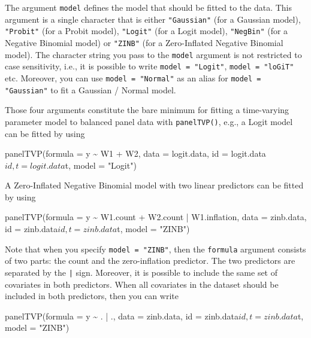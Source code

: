 \documentclass[a4paper, preprint, 3p,
authoryear]{elsarticle} %
\newenvironment{Shaded}{\begin{snugshade}}{\end{snugshade}}
\newcommand{\NormalTok}[1]{#1}
\begin{document}
The argument \texttt{model} defines the model that should be fitted to
the data. This argument is a single character that is either
\texttt{"Gaussian"} (for a Gaussian model), \texttt{"Probit"} (for a
Probit model), \texttt{"Logit"} (for a Logit model), \texttt{"NegBin"}
(for a Negative Binomial model) or \texttt{"ZINB"} (for a Zero-Inflated
Negative Binomial model). The character string you pass to the
\texttt{model} argument is not restricted to case sensitivity, i.e., it
is possible to write \texttt{model = "Logit"}, \texttt{model = "loGiT"}
etc. Moreover, you can use \texttt{model = "Normal"} as an alias for
\texttt{model = "Gaussian"} to fit a Gaussian / Normal model.

Those four arguments constitute the bare minimum for fitting a
time-varying parameter model to balanced panel data with
\texttt{panelTVP()}, e.g., a Logit model can be fitted by using

\begin{Shaded}
\begin{Highlighting}[]
\NormalTok{panelTVP(formula = y \textasciitilde{} W1 + W2,}
\NormalTok{         data = logit.data,}
\NormalTok{         id = logit.data$id,}
\NormalTok{         t = logit.data$t,}
\NormalTok{         model = "Logit")}
\end{Highlighting}
\end{Shaded}

A Zero-Inflated Negative Binomial model with two linear predictors can
be fitted by using

\begin{Shaded}
\begin{Highlighting}[]
\NormalTok{panelTVP(formula = y \textasciitilde{} W1.count + W2.count | W1.inflation,}
\NormalTok{         data = zinb.data,}
\NormalTok{         id = zinb.data$id,}
\NormalTok{         t = zinb.data$t,}
\NormalTok{         model = "ZINB")}
\end{Highlighting}
\end{Shaded}

Note that when you specify \texttt{model = "ZINB"}, then the
\texttt{formula} argument consists of two parts: the count and the
zero-inflation predictor. The two predictors are separated by the
\texttt{|} sign. Moreover, it is possible to include the same set of
covariates in both predictors. When all covariates in the dataset should
be included in both predictors, then you can write

\begin{Shaded}
\begin{Highlighting}[]
\NormalTok{panelTVP(formula = y \textasciitilde{} . | .,}
\NormalTok{         data = zinb.data,}
\NormalTok{         id = zinb.data$id,}
\NormalTok{         t = zinb.data$t,}
\NormalTok{         model = "ZINB")}
\end{Highlighting}
\end{Shaded}
\end{document}
